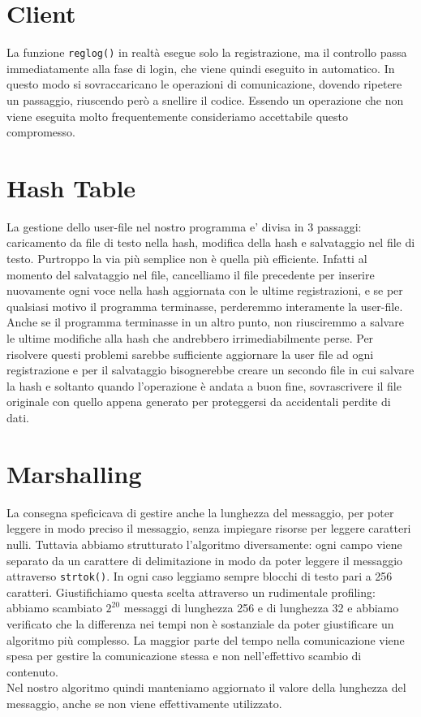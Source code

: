 \documentclass[a4paper, 11pt]{article} %
\begin{document}
\section*{Client}
La funzione \texttt{reglog()} in realtà esegue solo la registrazione, ma il controllo passa immediatamente alla fase di login, che viene quindi eseguito in automatico. In questo modo si sovraccaricano le operazioni di comunicazione, dovendo ripetere un passaggio, riuscendo però a snellire il codice. Essendo un operazione che non viene eseguita molto frequentemente consideriamo accettabile questo compromesso. 
	
\section*{Hash Table}
La gestione dello user-file nel nostro programma e' divisa in 3 passaggi: caricamento da file di testo nella hash, modifica della hash e salvataggio nel file di testo. Purtroppo la via più semplice non è quella più efficiente. Infatti al momento del salvataggio nel file, cancelliamo il file precedente per inserire nuovamente ogni voce nella hash aggiornata con le ultime registrazioni, e se per qualsiasi motivo il programma terminasse, perderemmo interamente la user-file. Anche se il programma terminasse in un altro punto, non riusciremmo a salvare le ultime modifiche alla hash che andrebbero irrimediabilmente perse. Per risolvere questi problemi sarebbe sufficiente aggiornare la user file ad ogni registrazione e per il salvataggio bisognerebbe creare un secondo file in cui salvare la hash e soltanto quando l'operazione è andata a buon fine, sovrascrivere il file originale con quello appena generato per proteggersi da accidentali perdite di dati.

\section*{Marshalling}
La consegna speficicava di gestire anche la lunghezza del messaggio, per poter leggere in modo preciso il messaggio, senza impiegare risorse per leggere caratteri nulli. Tuttavia abbiamo strutturato l'algoritmo diversamente: ogni campo viene separato da un carattere di delimitazione in modo da poter leggere il messaggio attraverso \texttt{strtok()}. In ogni caso leggiamo sempre blocchi di testo pari a 256 caratteri. Giustifichiamo questa scelta attraverso un rudimentale profiling: abbiamo scambiato $2^{20}$ messaggi di lunghezza 256 e di lunghezza 32 e abbiamo verificato che la differenza nei tempi non è sostanziale da poter giustificare un algoritmo più complesso. La maggior parte del tempo nella comunicazione viene spesa per gestire la comunicazione stessa e non nell'effettivo scambio di contenuto.\\
Nel nostro algoritmo quindi manteniamo aggiornato il valore della lunghezza del messaggio, anche se non viene effettivamente utilizzato. 
\end{document}
